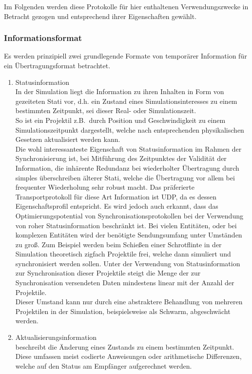\documentclass[11pt,twoside,a4paper]{article}
\begin{document}
Im Folgenden werden diese Protokolle für hier enthaltenen Verwendungszwecke in Betracht gezogen und entsprechend ihrer Eigenschaften gewählt.

\subsubsection{Informationsformat}

Es werden prinzipiell zwei grundlegende Formate von temporärer Information für ein Übertragungsformat betrachtet.
\begin{enumerate}
\item Statusinformation\\
In der Simulation liegt die Information zu ihren Inhalten in Form von gezeiteten Stati vor, d.h. ein Zustand eines Simulationsinteresses zu einem bestimmten Zeitpunkt, sei dieser Real- oder Simulationszeit. \\
So ist ein Projektil z.B.~durch Position und Geschwindigkeit zu einem Simulationszeitpunkt dargestellt, welche nach entsprechenden physikalischen Gesetzen aktualisiert werden kann.\\
Die wohl interessanteste Eigenschaft von Statusinformation im Rahmen der Synchronisierung ist, bei Mitführung des Zeitpunktes der Validität der Information, die inhärente Redundanz bei wiederholter Übertragung durch simples überschreiben älterer Stati, welche die Übertragung vor allem bei frequenter Wiederholung sehr robust macht.
Das präferierte Transportprotokoll für diese Art Information ist UDP, da es dessen Eigenschaftsprofil entspricht.
Es wird jedoch auch erkannt, dass das Optimierungspotential von Synchronisationsprotokollen bei der Verwendung von roher Statusinformation beschränkt ist. Bei vielen Entitäten, oder bei komplexen Entitäten wird der benötigte Sendungsumfang unter Umständen zu groß.
Zum Beispiel werden beim Schießen einer Schrotflinte in der Simulation theoretisch zigfach Projektile frei, welche dann simuliert und synchronisiert werden sollen.
Unter der Verwendung von Statusinformation zur Synchronisation dieser Projektile steigt die Menge der zur Synchronisation versendeten Daten mindestens linear mit der Anzahl der Projektile.\\
Dieser Umstand kann nur durch eine abstraktere Behandlung von mehreren Projektilen in der Simulation, beispielsweise als Schwarm, abgeschwächt werden.
\item Aktualisierungsinformation\\
beschreibt die Änderung eines Zustands zu einem bestimmten Zeitpunkt. Diese umfassen meist codierte Anweisungen oder arithmetische Differenzen, welche auf den Status am Empfänger aufgerechnet werden.\\

\end{enumerate}
\end{document}
